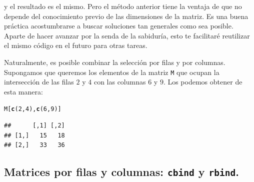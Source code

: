 \documentclass[10pt,a4paper]{article}\usepackage[]{graphicx}\usepackage[]{color}
\makeatletter
\newcommand{\hlnum}[1]{\textcolor[rgb]{0.686,0.059,0.569}{#1}}%
\newcommand{\hlstd}[1]{\textcolor[rgb]{0.345,0.345,0.345}{#1}}%
\newcommand{\hlkwd}[1]{\textcolor[rgb]{0.737,0.353,0.396}{\textbf{#1}}}%
\newenvironment{kframe}{%
 \def\at@end@of@kframe{}%
 \ifinner\ifhmode%
  \def\at@end@of@kframe{\end{minipage}}%
  \begin{minipage}{\columnwidth}%
 \fi\fi%
 \def\FrameCommand##1{\hskip\@totalleftmargin \hskip-\fboxsep
 \colorbox{shadecolor}{##1}\hskip-\fboxsep
     \hskip-\linewidth \hskip-\@totalleftmargin \hskip\columnwidth}%
 \MakeFramed {\advance\hsize-\width
   \@totalleftmargin\z@ \linewidth\hsize
   \@setminipage}}%
 {\par\unskip\endMakeFramed%
 \at@end@of@kframe}
\newenvironment{knitrout}{}{} %
\makeatother
\begin{document}
     y el resultado es el mismo. Pero el método anterior tiene la ventaja de que no depende del conocimiento previo de las dimensiones de la matriz. Es una buena práctica acostumbrarse a buscar soluciones tan generales como sea posible. Aparte de hacer avanzar por la senda de la sabiduría, esto te facilitaré reutilizar el mismo código en el futuro para otras tareas.

Naturalmente, es posible combinar la selección por filas y por columnas. Supongamos que queremos los elementos de la matriz {\tt M} que ocupan la intersección de las filas $2$ y $4$ con las columnas $6$ y $9$. Los podemos obtener de esta manera:
\begin{knitrout}
\color{fgcolor}\begin{kframe}
\begin{alltt}
\hlstd{M[} \hlkwd{c}\hlstd{(}\hlnum{2}\hlstd{,} \hlnum{4}\hlstd{),} \hlkwd{c}\hlstd{(}\hlnum{6}\hlstd{,} \hlnum{9}\hlstd{)]}
\end{alltt}
\begin{verbatim}
##      [,1] [,2]
## [1,]   15   18
## [2,]   33   36
\end{verbatim}
\end{kframe}
\end{knitrout}
     
     \subsection{Matrices por filas y columnas: {\tt cbind} y {\tt rbind}.}
\label{tut03:subsec:RbindCbind}
\end{document}

